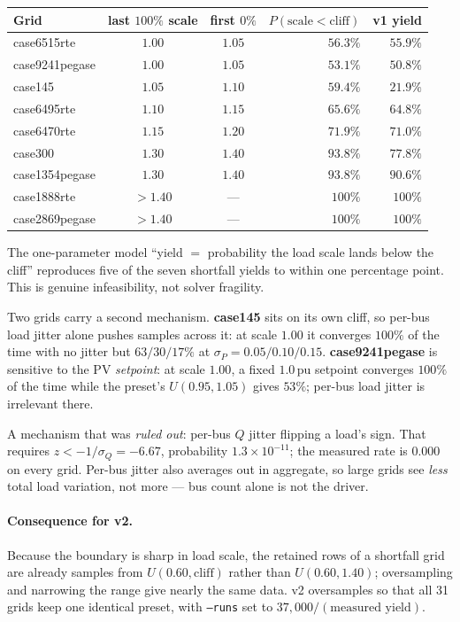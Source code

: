\documentclass{article}
\newcommand{\pu}{\,\text{pu}}
\begin{document}
\begin{center}
\begin{tabular}{lccrr}
\toprule
\textbf{Grid} & \textbf{last $100\%$ scale} & \textbf{first $0\%$} &
$P(\text{scale} < \text{cliff})$ & \textbf{v1 yield} \\
\midrule
case6515rte     & $1.00$ & $1.05$ & $56.3\%$ & $55.9\%$ \\
case9241pegase  & $1.00$ & $1.05$ & $53.1\%$ & $50.8\%$ \\
case145         & $1.05$ & $1.10$ & $59.4\%$ & $21.9\%$ \\
case6495rte     & $1.10$ & $1.15$ & $65.6\%$ & $64.8\%$ \\
case6470rte     & $1.15$ & $1.20$ & $71.9\%$ & $71.0\%$ \\
case300         & $1.30$ & $1.40$ & $93.8\%$ & $77.8\%$ \\
case1354pegase  & $1.30$ & $1.40$ & $93.8\%$ & $90.6\%$ \\
case1888rte     & $>1.40$ & --- & $100\%$ & $100\%$ \\
case2869pegase  & $>1.40$ & --- & $100\%$ & $100\%$ \\
\bottomrule
\end{tabular}
\end{center}

\noindent
The one-parameter model ``yield $=$ probability the load scale lands below the
cliff'' reproduces five of the seven shortfall yields to within one percentage
point.  This is genuine infeasibility, not solver fragility.

Two grids carry a second mechanism.  \textbf{case145} sits on its own cliff, so
per-bus load jitter alone pushes samples across it: at scale $1.00$ it converges
$100\%$ of the time with no jitter but $63/30/17\%$ at
$\sigma_P = 0.05/0.10/0.15$.  \textbf{case9241pegase} is sensitive to the PV
\emph{setpoint}: at scale $1.00$, a fixed $1.0\pu$ setpoint converges $100\%$ of
the time while the preset's $U(0.95,1.05)$ gives $53\%$; per-bus load jitter is
irrelevant there.

A mechanism that was \emph{ruled out}: per-bus $Q$ jitter flipping a load's
sign.  That requires $z < -1/\sigma_Q = -6.67$, probability $1.3\times10^{-11}$;
the measured rate is $0.000$ on every grid.  Per-bus jitter also averages out in
aggregate, so large grids see \emph{less} total load variation, not more --- bus
count alone is not the driver.

\paragraph{Consequence for v2.}  Because the boundary is sharp in load scale,
the retained rows of a shortfall grid are already samples from
$U(0.60, \text{cliff})$ rather than $U(0.60, 1.40)$; oversampling and narrowing
the range give nearly the same data.  v2 oversamples so that all 31 grids keep
one identical preset, with \texttt{--runs} set to
$37{,}000 / (\text{measured yield})$.
\end{document}
